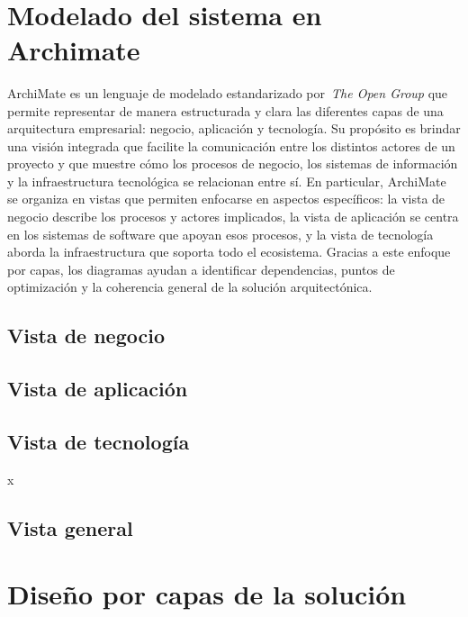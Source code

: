 \label{cap:disenio}
\mbox{}\\
\section{Modelado del sistema en Archimate}
ArchiMate es un lenguaje de modelado estandarizado por~\textit{The Open Group} que permite representar de manera estructurada y clara las diferentes capas de una arquitectura empresarial: negocio, aplicación y tecnología. Su propósito es brindar una visión integrada que facilite la comunicación entre los distintos actores de un proyecto y que muestre cómo los procesos de negocio, los sistemas de información y la infraestructura tecnológica se relacionan entre sí.
En particular, ArchiMate se organiza en vistas que permiten enfocarse en aspectos específicos: la vista de negocio describe los procesos y actores implicados, la vista de aplicación se centra en los sistemas de software que apoyan esos procesos, y la vista de tecnología aborda la infraestructura que soporta todo el ecosistema. Gracias a este enfoque por capas, los diagramas ayudan a identificar dependencias, puntos de optimización y la coherencia general de la solución arquitectónica.

\subsection{Vista de negocio}


\subsection{Vista de aplicación}


\subsection{Vista de tecnología}
x


\subsection{Vista general}


\section{Diseño por capas de la solución}

